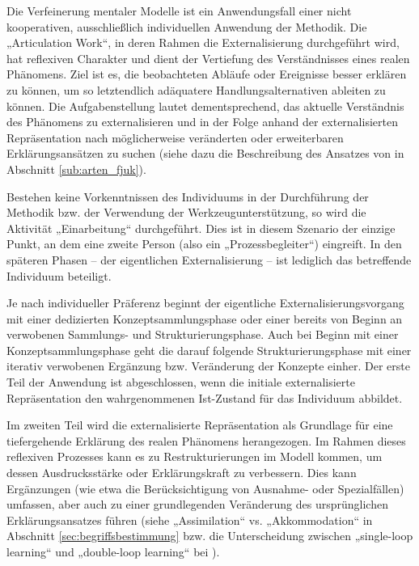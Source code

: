 Die Verfeinerung mentaler Modelle ist ein Anwendungsfall einer nicht kooperativen, ausschließlich individuellen Anwendung der Methodik. Die „Articulation Work“, in deren Rahmen die Externalisierung durchgeführt wird, hat reflexiven Charakter und dient der Vertiefung des Verständnisses eines realen Phänomens. Ziel ist es, die beobachteten Abläufe oder Ereignisse besser erklären zu können, um so letztendlich adäquatere Handlungsalternativen ableiten zu können. Die Aufgabenstellung lautet dementsprechend, das aktuelle Verständnis des Phänomens zu externalisieren und in der Folge anhand der externalisierten Repräsentation nach möglicherweise veränderten oder erweiterbaren Erklärungsansätzen zu suchen (siehe dazu die Beschreibung des Ansatzes von \citet{Fjuk97} in Abschnitt \ref{sub:arten_fjuk}).

Bestehen keine Vorkenntnissen des Individuums in der Durchführung der Methodik bzw. der Verwendung der Werkzeugunterstützung, so wird die Aktivität „Einarbeitung“ durchgeführt. Dies ist in diesem Szenario der einzige Punkt, an dem eine zweite Person (also ein „Prozessbegleiter“) eingreift. In den späteren Phasen -- der eigentlichen Externalisierung -- ist lediglich das betreffende Individuum beteiligt.

Je nach individueller Präferenz beginnt der eigentliche Externalisierungsvorgang mit einer dedizierten Konzeptsammlungsphase oder einer bereits von Beginn an verwobenen Sammlungs- und Strukturierungsphase. Auch bei Beginn mit einer Konzeptsammlungsphase geht die darauf folgende Strukturierungsphase mit einer iterativ verwobenen Ergänzung bzw. Veränderung der Konzepte einher. Der erste Teil der Anwendung ist abgeschlossen, wenn die initiale externalisierte Repräsentation den wahrgenommenen Ist-Zustand für das Individuum abbildet.

Im zweiten Teil wird die externalisierte Repräsentation als Grundlage für eine tiefergehende Erklärung des realen Phänomens herangezogen. Im Rahmen dieses reflexiven Prozesses kann es zu Restrukturierungen im Modell kommen, um dessen Ausdrucksstärke oder Erklärungskraft zu verbessern. Dies kann Ergänzungen (wie etwa die Berücksichtigung von Ausnahme- oder Spezialfällen) umfassen, aber auch zu einer grundlegenden Veränderung des ursprünglichen Erklärungsansatzes führen (siehe „Assimilation“ vs. „Akkommodation“ in Abschnitt \ref{sec:begriffsbestimmung} bzw. die Unterscheidung zwischen „single-loop learning“ und „double-loop learning“ bei \citet{Argyris76}).

